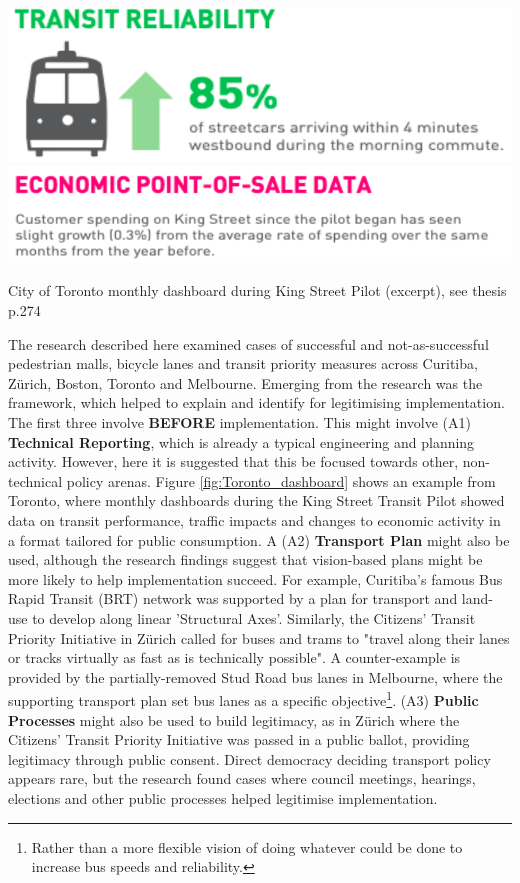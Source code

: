 \documentclass{tufte-handout}
\begin{document}
\begin{marginfigure}%
  \includegraphics[width=\linewidth]{Toronto_dashboard_1}
   \includegraphics[width=\linewidth]{Toronto_dashboard_4}
  \caption{City of Toronto monthly dashboard during King Street Pilot (excerpt), see thesis p.274}
  \label{fig:Toronto_dashboard}
\end{marginfigure}

 The research described here examined cases of successful and not-as-successful pedestrian malls, bicycle lanes and transit priority measures across Curitiba, Zürich, Boston, Toronto and Melbourne\cite{Reynolds:2020aa}. Emerging from the research was the framework, which helped to explain and identify  for legitimising implementation. The first three involve  \textbf{BEFORE} implementation. This might involve (A1) \textbf{Technical Reporting}, which is already a typical engineering and planning activity. However, here it is suggested that this be focused towards other, non-technical policy arenas. Figure \ref{fig:Toronto_dashboard} shows an example from Toronto, where monthly dashboards during the King Street Transit Pilot showed data on transit performance, traffic impacts and changes to economic activity in a format tailored for public consumption. A (A2) \textbf{Transport Plan} might also be used, although the research findings suggest that vision-based plans might be more likely to help implementation succeed. For example, Curitiba's famous Bus Rapid Transit (BRT) network was supported by a plan for transport and land-use to develop along linear 'Structural Axes'. Similarly, the Citizens' Transit Priority Initiative in Zürich called for buses and trams to "travel along their lanes or tracks virtually as fast as is technically possible"\cite{Nash:2001ab}. A counter-example is provided by the partially-removed Stud Road bus lanes in Melbourne, where the supporting transport plan set bus lanes as a specific objective\footnote{Rather than a more flexible vision of doing whatever could be done to increase bus speeds and reliability.}. (A3) \textbf{Public Processes} might also be used to build legitimacy, as in Zürich where the Citizens' Transit Priority Initiative was passed in a public ballot, providing legitimacy through public consent. Direct democracy deciding transport policy appears rare, but the research found cases where council meetings, hearings, elections and other public processes helped legitimise implementation.  
\end{document}
